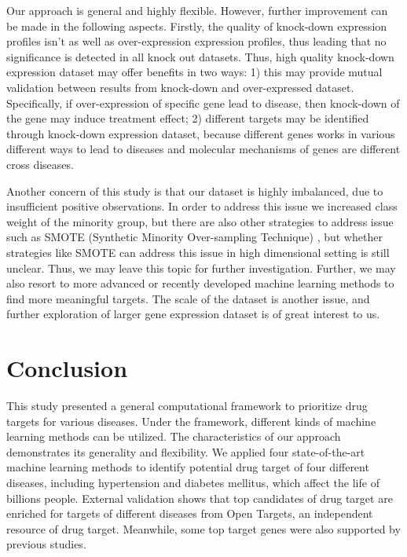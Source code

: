   Our approach is general and highly flexible. However, further improvement can be made in the following aspects. Firstly, the quality of knock-down expression profiles isn’t as well as over-expression expression profiles, thus leading that no significance is detected in all knock out datasets. Thus, high quality knock-down expression dataset may offer benefits in two ways: 1) this may provide mutual validation between results from knock-down and over-expressed dataset. Specifically, if over-expression of specific gene lead to disease, then knock-down of the gene may induce treatment effect; 2) different targets may be identified through knock-down expression dataset, because different genes works in various different ways to lead to diseases and molecular mechanisms of genes are different cross diseases. 

  Another concern of this study is that our dataset is highly imbalanced, due to insufficient positive observations. In order to address this issue we increased class weight of the minority group, but there are also other strategies to address issue such as SMOTE (Synthetic Minority Over-sampling Technique) \cite{chawla2002smote}, but whether strategies like SMOTE can address this issue in high dimensional setting is still unclear. Thus, we may leave this topic for further investigation. Further, we may also resort to more advanced or recently developed machine learning methods to find more meaningful targets. The scale of the dataset is another issue, and further exploration of larger gene expression dataset is of great interest to us. 

\section{Conclusion}
  This study presented a general computational framework to prioritize drug targets for various diseases. Under the framework, different kinds of machine learning methods can be utilized. The characteristics of our approach demonstrates its generality and flexibility. We applied four state-of-the-art machine learning methods to identify potential drug target of four different diseases, including hypertension and diabetes mellitus, which affect the life of billions people. External validation shows that top candidates of drug target are enriched for targets of different diseases from Open Targets, an independent resource of drug target. Meanwhile, some top target genes were also supported by previous studies.

